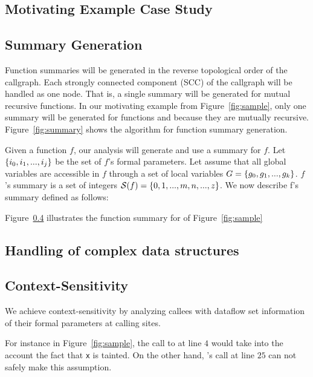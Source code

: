 \subsection{Motivating Example Case Study}\label{sec:sampleSummary}

\subsection{Summary Generation}\label{sec:summaries}

Function summaries will be generated in the reverse
topological order of the callgraph. Each strongly connected
component (SCC) of the callgraph will be handled as one
node. That is, a single summary will be generated for
mutual recursive functions. In our motivating example
from Figure~\ref{fig:sample}, only one summary will
be generated for functions \even{} and \odd{} because they
are mutually recursive.
Figure~\ref{fig:summary} shows the algorithm for function
summary generation.

Given a function $f$, our analysis will generate and use
a summary for $f$. Let $\{i_0, i_1, ..., i_j\}$ be the set
of $f$'s formal parameters. Let assume that all global variables
are accessible in $f$ through a set of local variables 
$G = \{g_0, g_1, ..., g_k\}$. $f$'s summary is a set of integers 
$\mathcal{S}(f) = \{0, 1, ...,m, n, ..., z\}$.
We now describe f's summary 
defined as follows: 

Figure~\ref{} illustrates the function summary for \main{}
of Figure~\ref{fig:sample}

\subsection{Handling of complex data structures}

\subsection{Context-Sensitivity} 

We achieve context-sensitivity by analyzing callees
with dataflow set information of their formal parameters
at calling sites.

For instance in Figure~\ref{fig:sample}, the call to \even{} at
line $4$ would take into the account the fact that \texttt{x}
is tainted.
On the other hand, \even{}'s call at line $25$ can not safely
make this assumption.